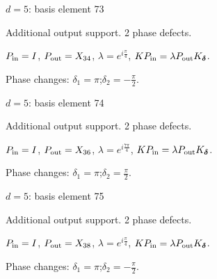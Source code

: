 \newpage
{}
{\Large $d=5$: basis element 73}\par
Additional output support. 2 phase defects.
\begin{center}
\end{center}
\vspace{-1mm}
$P_{\rm in}=I$, \quad $P_{\rm out}=X_{34}$, \quad $\lambda=e^{i\frac{\pi}{4}}$, \qquad $K P_{\rm in}=\lambda P_{\rm out}K_{\boldsymbol\delta}$.
\par\smallskip\begin{minipage}{.98\linewidth}\small Phase changes: $\delta_{1}=\pi$;\quad $\delta_{2}=-\frac{\pi}{2}$.\end{minipage}
\vfill
{\footnotesize\texttt{}}
\newpage
{}
{\Large $d=5$: basis element 74}\par
Additional output support. 2 phase defects.
\begin{center}
\end{center}
\vspace{-1mm}
$P_{\rm in}=I$, \quad $P_{\rm out}=X_{36}$, \quad $\lambda=e^{i\frac{7\pi}{4}}$, \qquad $K P_{\rm in}=\lambda P_{\rm out}K_{\boldsymbol\delta}$.
\par\smallskip\begin{minipage}{.98\linewidth}\small Phase changes: $\delta_{1}=\pi$;\quad $\delta_{2}=\frac{\pi}{2}$.\end{minipage}
\vfill
{\footnotesize\texttt{}}
\newpage
{}
{\Large $d=5$: basis element 75}\par
Additional output support. 2 phase defects.
\begin{center}
\end{center}
\vspace{-1mm}
$P_{\rm in}=I$, \quad $P_{\rm out}=X_{38}$, \quad $\lambda=e^{i\frac{\pi}{4}}$, \qquad $K P_{\rm in}=\lambda P_{\rm out}K_{\boldsymbol\delta}$.
\par\smallskip\begin{minipage}{.98\linewidth}\small Phase changes: $\delta_{1}=\pi$;\quad $\delta_{2}=-\frac{\pi}{2}$.\end{minipage}
\vfill
{\footnotesize\texttt{}}
\newpage
{}
